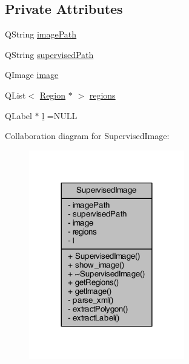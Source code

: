 \subsection*{Private Attributes}
\begin{DoxyCompactItemize}
\item 
Q\+String \hyperlink{class_supervised_image_a39f8b0212d2dae489d7b060b0d8dd1b9}{image\+Path}
\item 
Q\+String \hyperlink{class_supervised_image_aeeb634f3804dffba600e6aea71fc353e}{supervised\+Path}
\item 
Q\+Image \hyperlink{class_supervised_image_a0641d3087990ef954a6d5e88e927bbc5}{image}
\item 
Q\+List$<$ \hyperlink{class_region}{Region} $\ast$ $>$ \hyperlink{class_supervised_image_a264d8baa97fa79247b310a94e160e7fb}{regions}
\item 
Q\+Label $\ast$ \hyperlink{class_supervised_image_a2f1fcadc1267a86ad9d6469b0b2d11b5}{l} =N\+U\+L\+L
\end{DoxyCompactItemize}


Collaboration diagram for Supervised\+Image\+:\nopagebreak
\begin{figure}[H]
\begin{center}
\leavevmode
\includegraphics[width=192pt]{class_supervised_image__coll__graph}
\end{center}
\end{figure}


